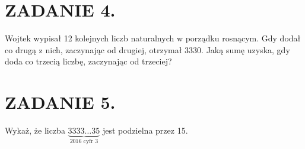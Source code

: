 \documentclass[10pt]{article}
\begin{document}
\section*{ZADANIE 4.}
Wojtek wypisał 12 kolejnych liczb naturalnych w porządku rosnącym. Gdy dodał co drugą z nich, zaczynając od drugiej, otrzymał 3330. Jaką sumę uzyska, gdy doda co trzecią liczbę, zaczynając od trzeciej?

\section*{ZADANIE 5.}
Wykaż, że liczba \(\underbrace{3333 \ldots 35}_{2016 \text { cyfr } 3}\) jest podzielna przez 15.
\end{document}
